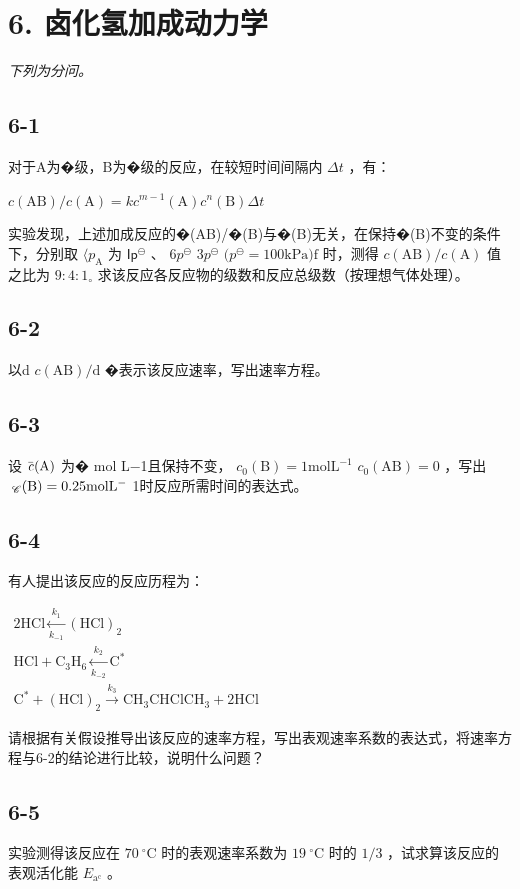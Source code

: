\section*{6. 卤化氢加成动力学}
\textit{下列为分问。}

\subsection*{6-1}
对于A为�级，B为�级的反应，在较短时间间隔内 $\Delta t$ ，有：

$
c (\mathrm{AB}) / c (\mathrm{A}) = k c ^ {m - 1} (\mathrm{A}) c ^ {n} (\mathrm{B}) \Delta t
$

实验发现，上述加成反应的�(AB)/�(B)与�(B)⽆关，在保持�(B)不变的条件下，分别取 $\langle p _ { \mathrm { A } }$ 为 ${ \mathsf { I } } { \mathsf { p } } ^ { \ominus }$ 、 $6 p ^ { \ominus }$ $3 p ^ { \ominus }$ $( p ^ { \ominus } = 1 0 0 \mathrm { { k P a } ) \mathrm { { f } } }$ 时，测得 $c ( \mathrm { A B } ) / c ( \mathrm { A } )$ 值之⽐为 $9 { : } 4 { : } 1 _ { \circ }$ 求该反应各反应物的级数和反应总级数（按理想⽓体处理）。

\subsection*{6-2}
以d $c ( \mathrm { A B } ) / \mathrm { d }$ �表⽰该反应速率，写出速率⽅程。

\subsection*{6-3}
设 $\mathrm { \bar { \it { c } } } ( \mathrm { A } )$ 为� mol L−1且保持不变， $c _ { 0 } ( \mathrm { B } ) = 1 \mathrm { m o l } \mathrm { L } ^ { - 1 }$ $c _ { 0 } ( \mathrm { A B } ) = 0$ ，写出 $_ { \mathrm { { \tiny ~ \mathscr { C } } } } ( { \mathrm { { B } } } ) = 0 . 2 5 { \mathrm { m o l } } { \mathrm { { L } } } ^ { - }$ 1时反应所需时间的表达式。

\subsection*{6-4}
有⼈提出该反应的反应历程为：

$
\begin{array}{c} 2 \mathrm{HCl} \xleftarrow [ k _ {- 1} ]{k _ {1}} (\mathrm{HCl}) _ {2} \\ \mathrm{HCl} + \mathrm{C} _ {3} \mathrm{H} _ {6} \xleftarrow [ k _ {- 2} ]{k _ {2}} \mathrm{C} ^ {*} \\ \mathrm{C} ^ {*} + (\mathrm{HCl}) _ {2} \xrightarrow {k _ {3}} \mathrm{CH} _ {3} \mathrm{CHClCH} _ {3} + 2 \mathrm{HCl} \end{array}
$

请根据有关假设推导出该反应的速率⽅程，写出表观速率系数的表达式，将速率⽅程与6-2的结论进⾏⽐较，说明什么问题？

\subsection*{6-5}
实验测得该反应在 $7 0 ~ ^ { \circ } \mathrm { C }$ 时的表观速率系数为 $1 9 ~ ^ { \circ } \mathrm { C }$ 时的 $1 / 3$ ，试求算该反应的表观活化能 $E _ { \mathrm { a ^ { c } } }$ 。
